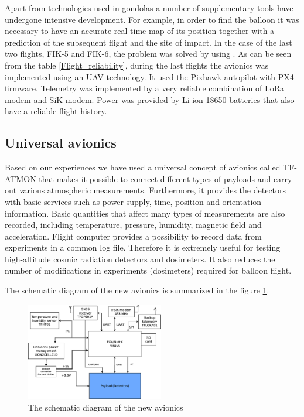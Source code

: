 \documentclass{Rpd}
\begin{document}
Apart from technologies used in gondolas a number of supplementary tools have undergone intensive development. For example, in order to find the balloon it was necessary to have an accurate real-time map of its position together with a prediction of the subsequent flight and the site of impact. In the case of the last two flights, FIK-5 and FIK-6, the problem was solved by using \cite{habhub_tracker}.
As can be seen from the table \ref{Flight_reliability}, during the last flights the avionics was implemented using an UAV technology. It used the Pixhawk autopilot with PX4 firmware. Telemetry was implemented by a very reliable combination of LoRa modem and SiK modem. Power was provided by Li-ion 18650 batteries that also have a reliable flight history.



\subsection{Universal avionics}
Based on our experiences we have used a universal concept of avionics called TF-ATMON that makes it possible to connect different types of payloads and carry out various atmospheric measurements. Furthermore, it provides the detectors with basic services such as power supply, time, position and orientation information. Basic quantities that affect many types of measurements are also recorded, including temperature, pressure, humidity, magnetic field and acceleration. Flight computer provides a possibility to record data from experiments in a common log file. Therefore it is extremely useful for testing high-altitude cosmic radiation detectors and dosimeters. It also reduces the number of modifications in experiments (dosimeters) required for balloon flight.

The schematic diagram of the new avionics is summarized in the figure \ref{avionics_schematics}.


\begin{center}
\begin{figure}%
	\centerline{\includegraphics[width=60mm]{img/avionics_block_schematics.eps}}
	\caption{The schematic diagram of the new avionics \label{avionics_schematics}}
\end{figure}
\end{center}
\end{document}

